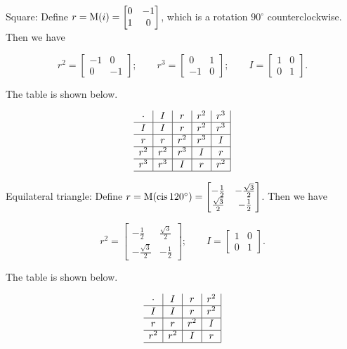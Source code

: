 \documentclass[../key.tex]{subfiles}
\begin{document}
Square: Define $r=\operatorname{M}(i) = \begin{bmatrix} 0 & -1 \\ 1 & 0 \end{bmatrix}$, which is a rotation $90^\circ$ counterclockwise. Then we have

$$r^2 = \begin{bmatrix} -1 & 0 \\ 0 & -1 \end{bmatrix};\qquad r^3 = \begin{bmatrix} 0 & 1 \\ -1 & 0 \end{bmatrix};\qquad I = \begin{bmatrix} 1 & 0 \\ 0 & 1 \end{bmatrix}.$$

The table is shown below.

$$\begin{array}{c|c|c|c|c|}
\cdot & I & r & r^2 & r^3 \\ \hline
I & I & r & r^2 & r^3 \\ \hline
r & r & r^2 & r^3 & I \\ \hline
r^2 & r^2 & r^3 & I & r \\ \hline
r^3 & r^3 & I & r & r^2 \\ \hline
\end{array}$$

Equilateral triangle: Define $r=\operatorname{M}(\operatorname{cis} 120^\circ)=\begin{bmatrix} -\frac{1}{2} & -\frac{\sqrt{3}}{2} \\ \frac{\sqrt{3}}{2} & -\frac{1}{2}\end{bmatrix}$. Then we have

$$r^2 = \begin{bmatrix} -\frac{1}{2} & \frac{\sqrt{3}}{2} \\ -\frac{\sqrt{3}}{2} & -\frac{1}{2}\end{bmatrix};\qquad I = \begin{bmatrix} 1 & 0 \\ 0 & 1 \end{bmatrix}.$$

The table is shown below.

$$\begin{array}{c|c|c|c|}
\cdot & I & r & r^2 \\ \hline
I & I & r & r^2 \\ \hline
r & r & r^2 & I \\ \hline
r^2 & r^2 & I & r \\ \hline
\end{array}$$
\end{document}
